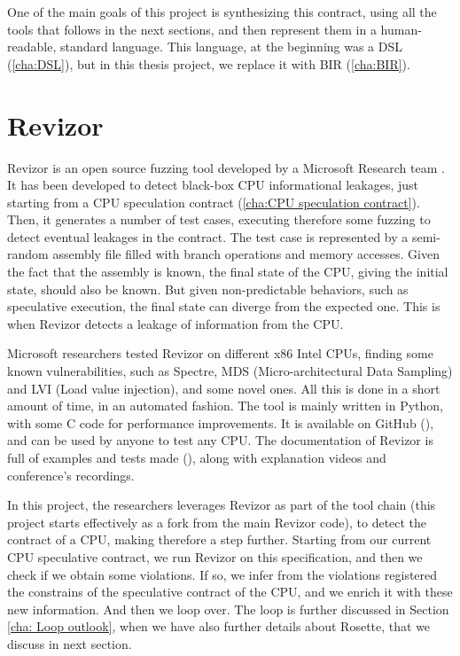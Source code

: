 One of the main goals of this project is synthesizing this contract, using all
the tools that follows in the next sections, and then represent them in a human-readable,
standard language. This language, at the beginning was a DSL (\ref{cha:DSL}), but
in this thesis project, we replace it with BIR (\ref{cha:BIR}).

\section{Revizor}
\label{cha:Revizor} Revizor is an open source fuzzing tool developed by a
Microsoft Research team \cite{article}. It has been developed to detect black-box
CPU informational leakages, just starting from a CPU speculation contract (\ref{cha:CPU
speculation contract}). Then, it generates a number of test cases, executing therefore
some fuzzing to detect eventual leakages in the contract. The test case is
represented by a semi-random assembly file filled with branch operations and
memory accesses. Given the fact that the assembly is known, the final state of
the CPU, giving the initial state, should also be known. But given non-predictable
behaviors, such as speculative execution, the final state can diverge from the expected
one. This is when Revizor detects a leakage of information from the CPU.

Microsoft researchers tested Revizor on different x86 Intel CPUs, finding some known
vulnerabilities, such as Spectre, MDS (Micro-architectural Data Sampling) and LVI
(Load value injection), and some novel ones. All this is done in a short amount of
time, in an automated fashion. The tool is mainly written in Python, with some C
code for performance improvements. It is available on GitHub (\cite{repo}), and
can be used by anyone to test any CPU. The documentation of Revizor is full of examples
and tests made (\cite{misc}), along with explanation videos and conference's
recordings.

In this project, the researchers leverages Revizor as part of the tool chain (this
project starts effectively as a fork from the main Revizor code), to detect the
contract of a CPU, making therefore a step further. Starting from our current
CPU speculative contract, we run Revizor on this specification, and then we
check if we obtain some violations. If so, we infer from the violations
registered the constrains of the speculative contract of the CPU, and we enrich it
with these new information. And then we loop over. The loop is further discussed
in Section \ref{cha: Loop outlook}, when we have also further details about
Rosette, that we discuss in next section.

